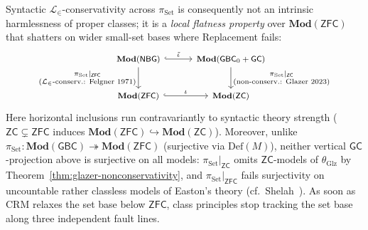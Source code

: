 Syntactic $\mathcal{L}_\in$-conservativity across $\pi_{\mathrm{Set}}$ is consequently not an intrinsic harmlessness of proper classes; it is a \emph{local flatness property} over $\mathbf{Mod}(\mathsf{ZFC})$ that shatters on wider small-set bases where Replacement fails:
\[
\begin{tikzcd}[row sep=2.2em, column sep=2.8em, font=\footnotesize]
\mathbf{Mod}(\mathsf{NBG})
  \arrow[r, hook, "\tilde{\iota}"]
  \arrow[d, "\substack{\pi_{\mathrm{Set}}|_{\mathsf{ZFC}}\\ \text{($\mathcal{L}_\in$-conserv.: Felgner 1971)}}"']
&
\mathbf{Mod}(\mathsf{GBC}_0 + \mathsf{GC})
  \arrow[d, "\substack{\pi_{\mathrm{Set}}|_{\mathsf{ZC}}\\ \text{(non-conserv.: Glazer 2023)}}"]
\\
\mathbf{Mod}(\mathsf{ZFC})
  \arrow[r, hook, "\iota"]
&
\mathbf{Mod}(\mathsf{ZC})
\end{tikzcd}
\]
Here horizontal inclusions run contravariantly to syntactic theory strength ($\mathsf{ZC} \subsetneq \mathsf{ZFC}$ induces $\mathbf{Mod}(\mathsf{ZFC}) \hookrightarrow \mathbf{Mod}(\mathsf{ZC})$). Moreover, unlike $\pi_{\mathrm{Set}} : \mathbf{Mod}(\mathsf{GBC}) \twoheadrightarrow \mathbf{Mod}(\mathsf{ZFC})$ (surjective via $\mathrm{Def}(M)$), neither vertical $\mathsf{GC}$-projection above is surjective on all models: $\pi_{\mathrm{Set}}|_{\mathsf{ZC}}$ omits $\mathsf{ZC}$-models of $\theta_{\mathrm{Glz}}$ by Theorem~\ref{thm:glazer-nonconservativity}, and $\pi_{\mathrm{Set}}|_{\mathsf{ZFC}}$ fails surjectivity on uncountable rather classless models of Easton's theory (cf.\ Shelah~\cite{Shelah78}). As soon as $\mathrm{CRM}$ relaxes the set base below $\mathsf{ZFC}$, class principles stop tracking the set base along three independent fault lines.


